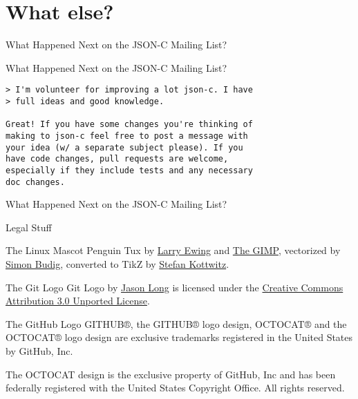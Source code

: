 \documentclass{beamer}
\begin{document}
\section*{What else?}

\begin{frame}{What Happened Next on the JSON-C Mailing List?}
\end{frame}

\begin{frame}[fragile]{What Happened Next on the JSON-C Mailing List?}
    \begin{verbatim}
> I'm volunteer for improving a lot json-c. I have
> full ideas and good knowledge.

Great! If you have some changes you're thinking of
making to json-c feel free to post a message with
your idea (w/ a separate subject please). If you
have code changes, pull requests are welcome,
especially if they include tests and any necessary
doc changes.
    \end{verbatim}
\end{frame}

\begin{frame}{What Happened Next on the JSON-C Mailing List?}
\end{frame}

\begin{frame}{Legal Stuff}
    \begin{block}{The Linux Mascot}
        Penguin Tux by \href{mailto:lewing@isc.tamu.edu}{Larry Ewing}
        and \href{http://isc.tamu.edu/~lewing/linux/}{The GIMP},
        vectorized by \href{http://www.home.unix-ag.org/simon/}{Simon Budig},
        converted to TikZ by
        \href{http://www.texample.net/weblog/2012/apr/28/tux-tex-tikz/}{Stefan Kottwitz}.
    \end{block}
    \begin{block}{The Git Logo}
        Git Logo by \href{http://twitter.com/jasonlong}{Jason Long} is
        licensed under the
        \href{http://creativecommons.org/licenses/by/3.0/}{Creative Commons Attribution 3.0 Unported License}.
    \end{block}
    \begin{block}{The GitHub Logo}
        GITHUB®, the GITHUB® logo design, OCTOCAT® and the OCTOCAT® logo
        design are exclusive trademarks registered in the United States
        by GitHub, Inc.

        The OCTOCAT design is the exclusive property of GitHub, Inc and
        has been federally registered with the United States Copyright
        Office. All rights reserved.
    \end{block}
\end{frame}
\end{document}
